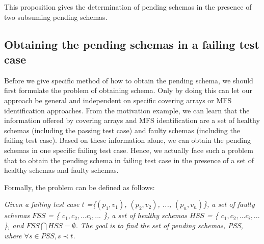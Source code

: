 This proposition gives the determination of pending schemas in the presence of two subsuming pending schemas.

\subsection{Obtaining the pending schemas in a failing test case}
Before we give specific method of how to obtain the pending schema, we should first formulate the problem of obtaining schema. Only by doing this can let our approach be general and independent on specific covering arrays or MFS identification approaches. From the motivation example, we can learn that the information offered by covering arrays and MFS identification are a set of healthy schemas (including the passing test case) and faulty schemas (including the failing test case). Based on these information alone, we can obtain the pending schemas in one specific failing test case. Hence, we actually face such a problem that to obtain the pending schema in failing test case in the presence of a set of healthy schemas and faulty schemas.

%

Formally, the problem can be defined as follows:

\emph{Given a failing test case $t$ =\{$(p_{1}, v_{1})$, $(p_{2}, v_{2})$, ..., $(p_{n}, v_{n})$\}, a set of faulty schemas $FSS$ = \{ $c_{1}, c_{2}, ... c_{i}, ...$ \},  a set of healthy schemas $HSS$ = \{ $c_{1}, c_{2}, ... c_{i}, ...$ \}, and $FSS \bigcap HSS = \emptyset$. The goal is to find the set of pending schemas, PSS, where $\forall s \in PSS, s \prec t$.}



